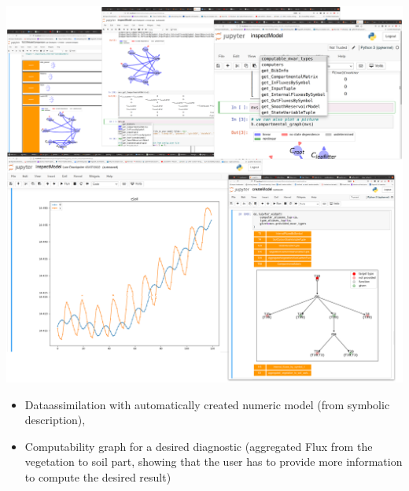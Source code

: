 \documentclass[36pt]{article}
\begin{document}
\begin{tcbposter}
{    \includegraphics[width=\columnwidth]{TabScreenCombined.pdf}
	  \begin{itemize}
	    \item 
      Dataassimilation with automatically created numeric model (from symbolic description), 
	    \item 
      Computability graph for a desired diagnostic (aggregated Flux from the vegetation to soil part, showing 
      that the user has to provide more information to compute the desired result)
	  \end{itemize}
}



\end{tcbposter}
\end{document}
